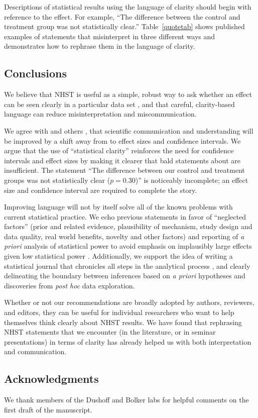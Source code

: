 Descriptions of statistical results using the language of clarity should begin with reference to the effect. For example, ``The difference between the control and treatment group was not statistically clear.'' Table~\ref{quotetab} shows published examples of statements that misinterpret \pvals in three different ways and demonstrates how to rephrase them in the language of clarity.

%

\subsection*{Conclusions}

\noindent We believe that NHST is useful as a simple, robust way to ask whether an effect can be seen clearly in a particular data set \citep{robinson2001past}, and that careful, clarity-based language can reduce misinterpretation and miscommunication.

We agree with \citet{Cohen1994} and others \citep{Goodman1999, ZiliakandMcCloskey2008, WassersteinandLazar2016}, that scientific communication and understanding will be improved by a shift away from \pvals to effect sizes and confidence intervals. We argue that the use of ``statistical clarity'' reinforces the need for confidence intervals and effect sizes by making it clearer that bald statements about \pvals are insufficient. The statement ``The difference between our control and treatment groups was not statistically clear ($p = 0.30$)'' is noticeably incomplete; an effect size and confidence interval are required to complete the story.

Improving language will not by itself solve all of the known problems with current statistical practice. We echo previous statements in favor of ``neglected factors'' (prior and related evidence, plausibility of mechanism, study design and data quality, real world benefits, novelty and other factors) \citep{McShaneetal.2017} and reporting of \emph{a priori} analysis of statistical power to avoid emphasis on implausibly large effects given low statistical power \citep[the ``winner's curse''][]{GelmanandCarlin2014, SzucsandIoannidis2017, Bernardietal.2017}. Additionally, we support the idea of writing a statistical journal that chronicles all steps in the analytical process \citep{Kassetal.2016}, and clearly delineating the boundary between inferences based on \emph{a priori} hypotheses and discoveries from \emph{post hoc} data exploration.

Whether or not our recommendations are broadly adopted by authors, reviewers, and editors, they can be useful for individual researchers who want to help themselves think clearly about NHST results. We have found that rephrasing NHST statements that we encounter (in the literature, or in seminar presentations) in terms of clarity has already helped us with both interpretation and communication.

\subsection*{Acknowledgments}

\noindent We thank members of the Dushoff and Bolker labs for helpful comments on the first draft of the manuscript.
